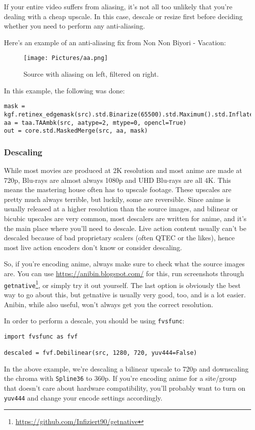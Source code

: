 \documentclass{scrartcl}
\begin{document}
If your entire video suffers from aliasing, it's not all too unlikely that you're dealing with a cheap upscale.  In this case, descale or resize first before deciding whether you need to perform any anti-aliasing.

\pagebreak
Here's an example of an anti-aliasing fix from Non Non Biyori - Vacation:
\begin{figure}[h]
\centering
\texttt{[image: Pictures/aa.png]}
\caption{Source with aliasing on left, filtered on right.}\label{fig:5}
\end{figure}

In this example, the following was done: 
\begin{lstlisting}
mask = kgf.retinex_edgemask(src).std.Binarize(65500).std.Maximum().std.Inflate()
aa = taa.TAAmbk(src, aatype=2, mtype=0, opencl=True)
out = core.std.MaskedMerge(src, aa, mask)
\end{lstlisting}

\subsubsection{Descaling}

While most movies are produced at 2K resolution and most anime are made at 720p, Blu-rays are almost always 1080p and UHD Blu-rays are all 4K.
This means the mastering house often has to upscale footage.  These upscales are pretty much always terrible, but luckily, some are reversible.
Since anime is usually released at a higher resolution than the source images, and bilinear or bicubic upscales are very common, most descalers are written for anime, and it's the main place where you'll need to descale.
Live action content usually can't be descaled because of bad proprietary scalers (often QTEC or the likes), hence most live action encoders don't know or consider descaling.

So, if you're encoding anime, always make sure to check what the source images are.
You can use \url{https://anibin.blogspot.com/} for this, run screenshots through \texttt{getnative}\footnote{\url{https://github.com/Infiziert90/getnative}}, or simply try it out yourself.
The last option is obviously the best way to go about this, but getnative is usually very good, too, and is a lot easier.  Anibin, while also useful, won't always get you the correct resolution.

In order to perform a descale, you should be using \texttt{fvsfunc}:
\begin{lstlisting}
import fvsfunc as fvf

descaled = fvf.Debilinear(src, 1280, 720, yuv444=False)
\end{lstlisting}
In the above example, we're descaling a bilinear upscale to 720p and downscaling the chroma with \texttt{Spline36} to 360p.
If you're encoding anime for a site/group that doesn't care about hardware compatibility, you'll probably want to turn on \texttt{yuv444} and change your encode settings accordingly.
\end{document}
